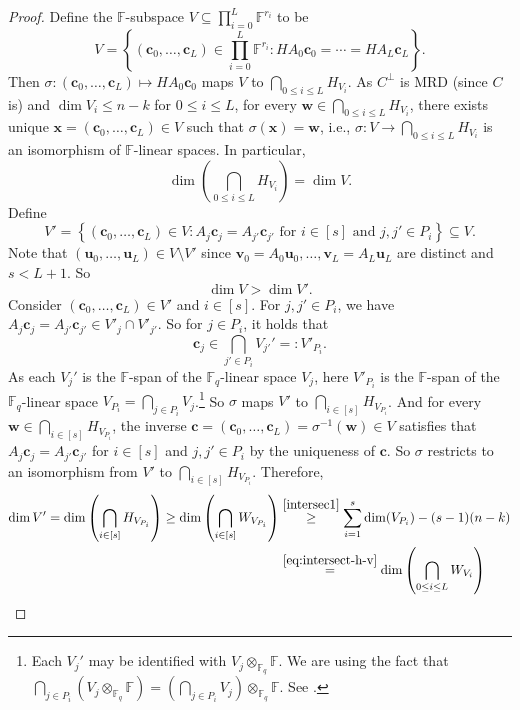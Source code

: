 \documentclass[11pt]{article}
\theoremstyle{plain}
\theoremstyle{definition}
\theoremstyle{remark}
\newcommand{\F}{\mathbb{F}}
\newcommand{\bv}{\bm{v}}
\newcommand{\bu}{\bm{u}}
\newcommand{\bw}{\bm{w}}
\newcommand{\bx}{\bm{x}}
\newcommand{\bc}{\bm{c}}
\begin{document}
\begin{proof}
Define the $\F$-subspace $V\subseteq \prod_{i=0}^L \F^{r_i}$ to be
\[
V=\left\{(\bc_0,\ldots,\bc_L)\in \prod_{i=0}^L \F^{r_i}: H A_0\bc_0=\cdots=H A_L\bc_{L}\right\}.
\]
Then $\sigma: (\bc_0,\dots,\bc_L)\mapsto HA_0 \bc_0$ maps $V$ to $\bigcap_{0\leq i\leq L}H_{V_{i}}$.
As $C^\perp$ is MRD (since $C$ is) and $\dim V_i\leq n-k$ for $0\leq i\leq L$, for every $\bw\in \bigcap_{0\leq i\leq L}H_{V_{i}}$, there exists unique $\bx=(\bc_0,\dots,\bc_L)\in V$ such that $\sigma(\bx)=\bw$, i.e., $\sigma: V\to \bigcap_{0\leq i\leq L}H_{V_{i}}$ is an isomorphism of $\F$-linear spaces. In particular,
\begin{equation}\label{eqref:intersect-h-v-2}
\dim\left(\bigcap_{0\leq i\leq L}H_{V_{i}}\right) = \dim V.
\end{equation}
Define 
\[
V'=\left\{(\bc_0,\ldots,\bc_L)\in V: A_j\bc_j=A_{j'}\bc_{j'} \text{ for } i\in [s] \text{ and } j,j'\in P_i\right\}\subseteq V.
\]
Note that $(\bu_0,\dots,\bu_L)\in V\setminus V'$ since $\bv_0=A_0\bu_0,\dots,\bv_L=A_L\bu_L$ are distinct and $s<L+1$. So 
\begin{equation}\label{eqref:v-vprime}
\dim V>\dim V'.
\end{equation}
Consider $(\bc_0,\dots,\bc_L)\in V'$ and $i\in [s]$. For $j,j'\in P_i$, we have
$A_j\bc_j=A_{j'}\bc_{j'}\in V'_j\cap V'_{j'}$. 
So for $j\in P_i$, it holds that 
\[
\bc_j\in \bigcap_{j'\in P_i} V_{j'}'=:V'_{P_i}.
\]
As each $V_j'$ is the $\F$-span of the $\F_q$-linear space $V_j$, here $V'_{P_i}$ is the $\F$-span of the $\F_q$-linear space $V_{P_i}=\bigcap_{j\in P_i} V_{j}$.\footnote{Each $V_j'$ may be identified with $V_j\otimes_{\F_q} \F$. We are using the fact that $\bigcap_{j\in P_i} (V_j\otimes_{\F_q} \F)=
\left(\bigcap_{j\in P_i} V_j\right) \otimes_{\F_q} \F$.
See \cite{Ell19}.
}
So $\sigma$ maps $V'$ to $\bigcap_{i\in [s]} H_{V_{P_i}}$.
And for every $\bw\in \bigcap_{i\in [s]} H_{V_{P_i}}$, the inverse $\bc=(\bc_0,\dots,\bc_L)=\sigma^{-1}(\bw)\in V$ satisfies that $A_j\bc_j=A_{j'}\bc_{j'}$ for $i\in [s]$ and $j,j'\in P_i$ by the uniqueness of $\bc$. So $\sigma$ restricts to an isomorphism from $V'$ to $\bigcap_{i\in [s]} H_{V_{P_i}}$.
Therefore,
\begin{equation}\label{eq:intersect-w-v}
\begin{aligned}
\dim V'=\dim\left(\bigcap_{i\in [s]} H_{V_{P_i}}\right)\geq \dim\left(\bigcap_{i\in [s]} W_{V_{P_i}}\right)
&\stackrel{\eqref{intersec1}}{\geq} \sum_{i=1}^s \dim(V_{P_i})-(s-1)(n-k)\\
&\stackrel{\eqref{eq:intersect-h-v}}{=}\dim\left(\bigcap_{0\leq i\leq L}W_{V_{i}}\right)

\end{aligned}
\end{equation}
\end{proof}
\end{document}

